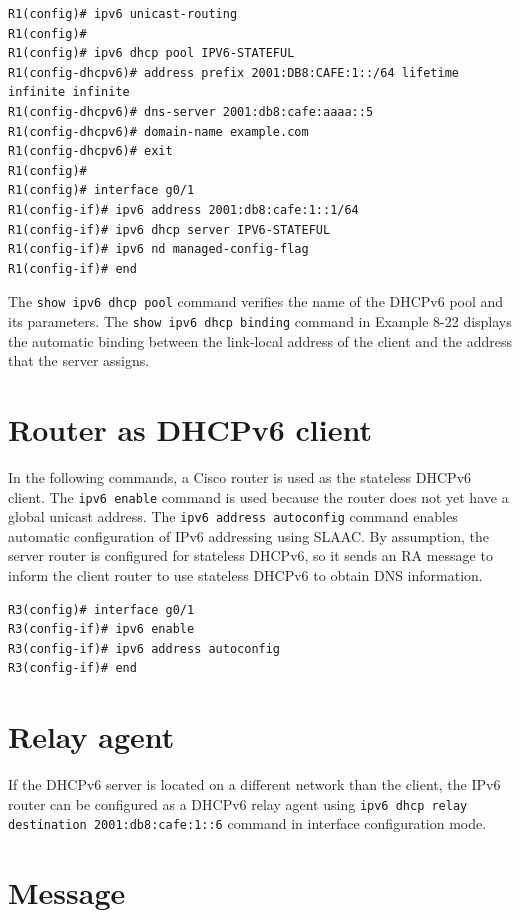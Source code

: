 \begin{verbatim}
R1(config)# ipv6 unicast-routing
R1(config)#
R1(config)# ipv6 dhcp pool IPV6-STATEFUL
R1(config-dhcpv6)# address prefix 2001:DB8:CAFE:1::/64 lifetime infinite infinite
R1(config-dhcpv6)# dns-server 2001:db8:cafe:aaaa::5
R1(config-dhcpv6)# domain-name example.com
R1(config-dhcpv6)# exit
R1(config)#
R1(config)# interface g0/1
R1(config-if)# ipv6 address 2001:db8:cafe:1::1/64
R1(config-if)# ipv6 dhcp server IPV6-STATEFUL
R1(config-if)# ipv6 nd managed-config-flag
R1(config-if)# end
\end{verbatim}

The \verb|show ipv6 dhcp pool| command verifies the name of the DHCPv6 pool and its parameters. The \verb|show ipv6 dhcp binding| command in Example 8-22 displays the automatic
binding between the link-local address of the client and the address that the server assigns. 

\section{Router as DHCPv6 client}

In the following commands, a Cisco router is used as the stateless DHCPv6 client. The \verb|ipv6 enable| command is used because the router does not yet have a global unicast address. The \verb|ipv6 address autoconfig| command enables automatic configuration of IPv6 addressing using SLAAC. By assumption, the server router is configured for stateless DHCPv6, so it sends an RA message to inform the client router to use stateless DHCPv6 to obtain DNS information.

\begin{verbatim}
R3(config)# interface g0/1
R3(config-if)# ipv6 enable
R3(config-if)# ipv6 address autoconfig
R3(config-if)# end
\end{verbatim}

\section{Relay agent}

If the DHCPv6 server is located on a different network than the client, the IPv6 router can be configured as a DHCPv6 relay agent using \verb|ipv6 dhcp relay destination 2001:db8:cafe:1::6| command in interface configuration mode.

\section{Message}


